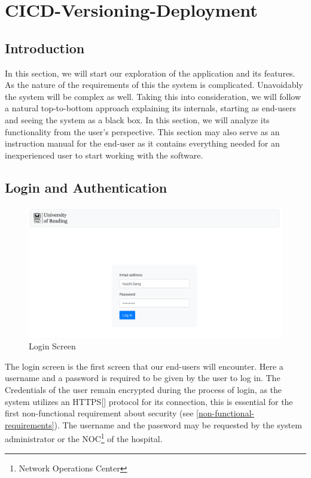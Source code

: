\chapter{CICD-Versioning-Deployment}
\label{cicd-versioning-deployment}
	\section{Introduction}
		In this section, we will start our exploration of the application and its features. As the nature of the requirements of this
		the system is complicated. Unavoidably the system will be complex as well. Taking this into consideration, we will follow a natural top-to-bottom
		approach explaining its internals, starting as end-users and seeing the system as a black box. In this section, we will analyze its 
		functionality from the user's perspective. This section may also serve as an instruction manual for the end-user as it contains everything needed
		for an inexperienced user to start working with the software.
	\section{Login and Authentication}
		\begin{figure}[H]
			\iftrue
			\centering
			\caption{Login Screen}
			\includegraphics[scale=0.3]{figures/login}
			\fi
		\end{figure}
		The login screen is the first screen that our end-users will encounter. Here a username and a password is required to be given by the 
		user to log in. The Credentials of the user remain encrypted during the process of login, as the system utilizes an HTTPS[\cite{rfc2818}] 
		protocol for its connection, this is essential for the first non-functional requirement about security (see \ref{non-functional-requirements}).
		The username and the password may be requested by the system administrator or the NOC\footnote{Network Operations Center} of the hospital.
